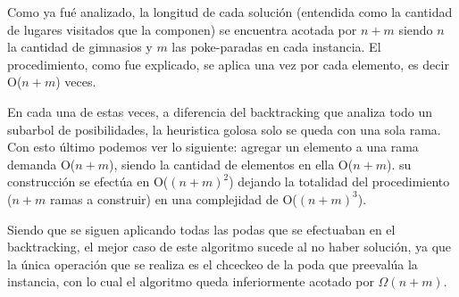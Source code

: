 Como ya fué analizado, la longitud de cada solución (entendida como la cantidad de lugares visitados que la componen) se encuentra acotada por $n + m$ siendo $n$ la cantidad de gimnasios y $m$ las poke-paradas en cada instancia. El procedimiento, como fue explicado, se aplica una vez por cada elemento, es decir O($n+m$) veces.

En cada una de estas veces, a diferencia del backtracking que analiza todo un subarbol de posibilidades, la heuristica golosa solo se queda con una sola rama. Con esto último podemos ver lo siguiente: agregar un elemento a una rama demanda O($n+m$), siendo la cantidad de elementos en ella O($n+m$). su construcción se efectúa en O($(n+m)^2$) dejando la totalidad del procedimiento ($n+m$ ramas a construir) en una complejidad de O($(n+m)^3$).

Siendo que se siguen aplicando todas las podas que se efectuaban en el backtracking, el mejor caso de este algoritmo sucede al no haber solución, ya que la única operación que se realiza es el chceckeo de la poda que preevalúa la instancia, con lo cual el algoritmo queda inferiormente acotado por $\Omega(n+m)$.